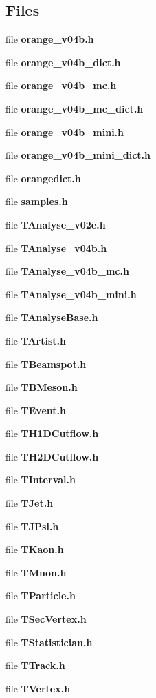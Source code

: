 \subsection*{Files}
\begin{CompactItemize}
\item 
file \textbf{orange\_\-v04b.h}
\item 
file \textbf{orange\_\-v04b\_\-dict.h}
\item 
file \textbf{orange\_\-v04b\_\-mc.h}
\item 
file \textbf{orange\_\-v04b\_\-mc\_\-dict.h}
\item 
file \textbf{orange\_\-v04b\_\-mini.h}
\item 
file \textbf{orange\_\-v04b\_\-mini\_\-dict.h}
\item 
file \textbf{orangedict.h}
\item 
file \textbf{samples.h}
\item 
file \textbf{TAnalyse\_\-v02e.h}
\item 
file \textbf{TAnalyse\_\-v04b.h}
\item 
file \textbf{TAnalyse\_\-v04b\_\-mc.h}
\item 
file \textbf{TAnalyse\_\-v04b\_\-mini.h}
\item 
file \textbf{TAnalyse\-Base.h}
\item 
file \textbf{TArtist.h}
\item 
file \textbf{TBeamspot.h}
\item 
file \textbf{TBMeson.h}
\item 
file \textbf{TEvent.h}
\item 
file \textbf{TH1DCutflow.h}
\item 
file \textbf{TH2DCutflow.h}
\item 
file \textbf{TInterval.h}
\item 
file \textbf{TJet.h}
\item 
file \textbf{TJPsi.h}
\item 
file \textbf{TKaon.h}
\item 
file \textbf{TMuon.h}
\item 
file \textbf{TParticle.h}
\item 
file \textbf{TSec\-Vertex.h}
\item 
file \textbf{TStatistician.h}
\item 
file \textbf{TTrack.h}
\item 
file \textbf{TVertex.h}
\end{CompactItemize}
